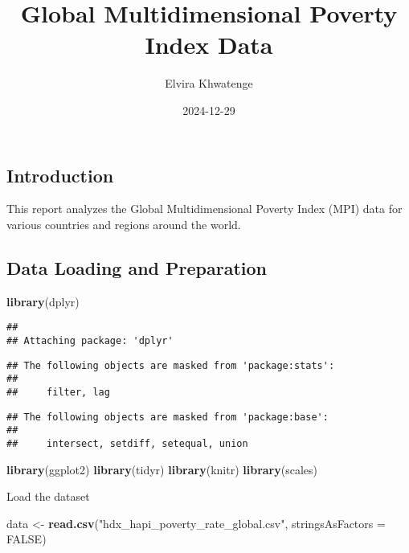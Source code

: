 \documentclass[
]{article}
\title{Global Multidimensional Poverty Index Data}
\author{Elvira Khwatenge}
\date{2024-12-29}
\newenvironment{Shaded}{\begin{snugshade}}{\end{snugshade}}
\newcommand{\AttributeTok}[1]{\textcolor[rgb]{0.13,0.29,0.53}{#1}}
\newcommand{\ConstantTok}[1]{\textcolor[rgb]{0.56,0.35,0.01}{#1}}
\newcommand{\FunctionTok}[1]{\textcolor[rgb]{0.13,0.29,0.53}{\textbf{#1}}}
\newcommand{\NormalTok}[1]{#1}
\newcommand{\OtherTok}[1]{\textcolor[rgb]{0.56,0.35,0.01}{#1}}
\newcommand{\StringTok}[1]{\textcolor[rgb]{0.31,0.60,0.02}{#1}}
\begin{document}
\maketitle

\hypertarget{introduction}{%
\subsection{Introduction}\label{introduction}}

This report analyzes the Global Multidimensional Poverty Index (MPI)
data for various countries and regions around the world.

\hypertarget{data-loading-and-preparation}{%
\subsection{Data Loading and
Preparation}\label{data-loading-and-preparation}}

\begin{Shaded}
\begin{Highlighting}[]
\FunctionTok{library}\NormalTok{(dplyr)}
\end{Highlighting}
\end{Shaded}

\begin{verbatim}
## 
## Attaching package: 'dplyr'
\end{verbatim}

\begin{verbatim}
## The following objects are masked from 'package:stats':
## 
##     filter, lag
\end{verbatim}

\begin{verbatim}
## The following objects are masked from 'package:base':
## 
##     intersect, setdiff, setequal, union
\end{verbatim}

\begin{Shaded}
\begin{Highlighting}[]
\FunctionTok{library}\NormalTok{(ggplot2)}
\FunctionTok{library}\NormalTok{(tidyr)}
\FunctionTok{library}\NormalTok{(knitr)}
\FunctionTok{library}\NormalTok{(scales)}
\end{Highlighting}
\end{Shaded}

Load the dataset

\begin{Shaded}
\begin{Highlighting}[]
\NormalTok{data }\OtherTok{\textless{}{-}} \FunctionTok{read.csv}\NormalTok{(}\StringTok{"hdx\_hapi\_poverty\_rate\_global.csv"}\NormalTok{, }\AttributeTok{stringsAsFactors =} \ConstantTok{FALSE}\NormalTok{)}
\end{Highlighting}
\end{Shaded}
\end{document}
